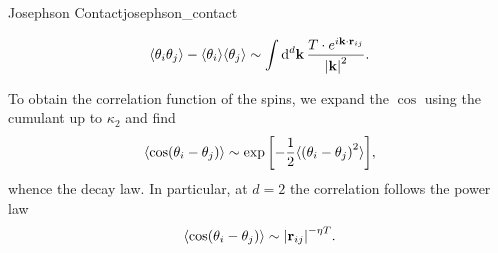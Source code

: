 \documentclass{article}
\begin{document}
\begin{example}{Josephson Contact}{josephson_contact}
\begin{itemize}
        \[ \langle \theta_i \theta_j \rangle - \langle \theta_i \rangle \langle \theta_j \rangle \sim \int \dd{^d \vb{k}} \frac{T\cdot e^{i \vb{k}\cdot \vb{r}_{ij}}}{\abs{\vb{k}}^2}. \]
    \end{itemize}
    To obtain the correlation function of the spins, we expand the $\cos$ using the cumulant up to $\kappa_2$ and find
    \[ \langle \cos(\theta_i - \theta_j) \rangle \sim \exp\qty[-\frac{1}{2}\langle \qty(\theta_i - \theta_j)^2 \rangle], \]
    whence the decay law.
    In particular, at $d=2$ the correlation follows the power law
    \[ \langle \cos(\theta_i - \theta_j) \rangle \sim \abs{\vb{r}_{ij}}^{-\eta T}. \]
\end{example}

% 
% 
\end{document}
